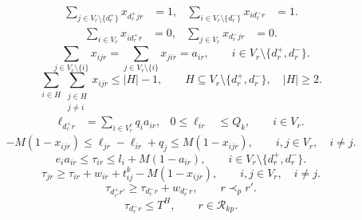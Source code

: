 \begin{equation}
\begin{aligned}
\sum_{j\in V_r\setminus\{d_r^{+}\}}x_{d_r^{+}jr}&=1, &
\sum_{i\in V_r\setminus\{d_r^{-}\}}x_{id_r^{-}r}&=1 .
\end{aligned}
\label{eq:unified-trip-start-end}
\end{equation}
\begin{equation}
\begin{aligned}
\sum_{i\in V_r}x_{id_r^{+}r}&=0, &
\sum_{j\in V_r}x_{d_r^{-}jr}&=0 .
\end{aligned}
\label{eq:unified-trip-direction}
\end{equation}
\begin{equation}
\sum_{j\in V_r\setminus\{i\}}x_{ijr}
=\sum_{j\in V_r\setminus\{i\}}x_{jir}=a_{ir},
\qquad i\in V_r\setminus\{d_r^{+},d_r^{-}\}.
\label{eq:unified-flow}
\end{equation}
\begin{equation}
\sum_{i\in H}\sum_{\substack{j\in H\\j\ne i}}x_{ijr}
\le |H|-1,
\qquad H\subseteq V_r\setminus\{d_r^{+},d_r^{-}\},\quad |H|\ge2.
\label{eq:unified-subtour}
\end{equation}
\begin{equation}
\begin{aligned}
\ell_{d_r^{+}r}&=\sum_{i\in V_r^{c}}q_i a_{ir}, &
0\le\ell_{ir}&\le Q_k,\qquad i\in V_r .
\end{aligned}
\label{eq:unified-load-bound}
\end{equation}
\begin{equation}
-M(1-x_{ijr})
\le\ell_{jr}-\ell_{ir}+q_j
\le M(1-x_{ijr}),
\qquad i,j\in V_r,\quad i\ne j .
\label{eq:unified-load-propagation}
\end{equation}
\begin{equation}
e_i a_{ir}
\le\tau_{ir}\le l_i+M(1-a_{ir}),
\qquad i\in V_r\setminus\{d_r^{+},d_r^{-}\}.
\label{eq:unified-time-window}
\end{equation}
\begin{equation}
\tau_{jr}
\ge\tau_{ir}+w_{ir}+t_{ij}^{k}-M(1-x_{ijr}),
\qquad i,j\in V_r,\quad i\ne j .
\label{eq:unified-time-propagation}
\end{equation}
\begin{equation}
\tau_{d_{r'}^{+}r'}
\ge\tau_{d_r^{-}r}+w_{d_r^{-}r},
\qquad r\prec_p r' .
\label{eq:unified-trip-link-time}
\end{equation}
\begin{equation}
\tau_{d_r^{-}r}\le T^{H},
\qquad r\in\mathcal R_{kp}.
\label{eq:unified-horizon}
\end{equation}
